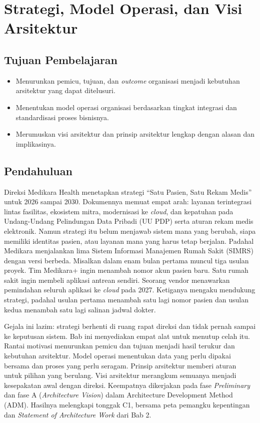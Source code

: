 \chapter{Strategi, Model Operasi, dan Visi Arsitektur}

\section*{Tujuan Pembelajaran}
\begin{itemize}
  \item Menurunkan pemicu, tujuan, dan \textit{outcome} organisasi menjadi
        kebutuhan arsitektur yang dapat ditelusuri.
  \item Menentukan model operasi organisasi berdasarkan tingkat integrasi dan
        standardisasi proses bisnisnya.
  \item Merumuskan visi arsitektur dan prinsip arsitektur lengkap dengan alasan
        dan implikasinya.
\end{itemize}

\section{Pendahuluan}

Direksi Medikara Health menetapkan strategi ``Satu Pasien, Satu Rekam Medis''
untuk 2026 sampai 2030. Dokumennya memuat empat arah: layanan terintegrasi
lintas fasilitas, ekosistem mitra, modernisasi ke \textit{cloud}, dan kepatuhan
pada Undang-Undang Pelindungan Data Pribadi (UU PDP) serta aturan rekam medis
elektronik. Namun strategi itu belum menjawab sistem mana yang berubah, siapa
memiliki identitas pasien, atau layanan mana yang harus tetap berjalan. Padahal
Medikara menjalankan lima Sistem Informasi Manajemen Rumah Sakit (SIMRS) dengan
versi berbeda. Misalkan dalam enam bulan pertama muncul tiga usulan proyek. Tim
Medikara+ ingin menambah nomor akun pasien baru. Satu rumah sakit ingin membeli
aplikasi antrean sendiri. Seorang vendor menawarkan pemindahan seluruh aplikasi
ke \textit{cloud} pada 2027. Ketiganya mengaku mendukung strategi, padahal
usulan pertama menambah satu lagi nomor pasien dan usulan kedua menambah satu
lagi salinan jadwal dokter.

Gejala ini lazim: strategi berhenti di ruang rapat direksi dan tidak pernah
sampai ke keputusan sistem. Bab ini menyediakan empat alat untuk menutup celah
itu. Rantai motivasi menurunkan pemicu dan tujuan menjadi hasil terukur dan
kebutuhan arsitektur. Model operasi menentukan data yang perlu dipakai bersama
dan proses yang perlu seragam. Prinsip arsitektur memberi aturan untuk pilihan
yang berulang. Visi arsitektur merangkum semuanya menjadi kesepakatan awal
dengan direksi. Keempatnya dikerjakan pada fase \textit{Preliminary} dan fase A
(\textit{Architecture Vision}) dalam Architecture Development Method
(ADM). Hasilnya melengkapi tonggak C1, bersama peta pemangku kepentingan dan
\textit{Statement of Architecture Work} dari Bab 2.

